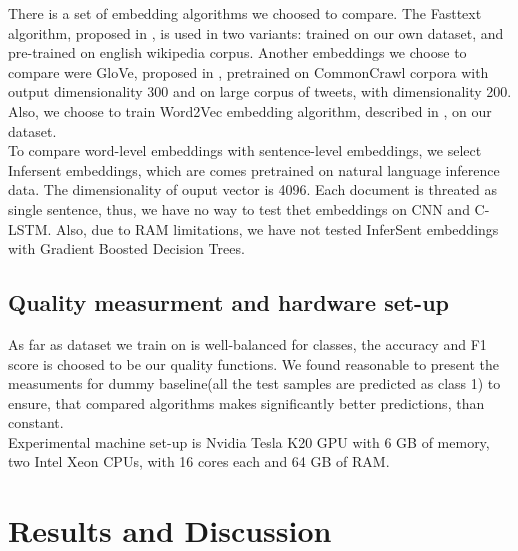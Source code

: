 \documentclass[unicode, 12pt, a4paper,oneside]{article}
\begin{document}
	There is a set of embedding algorithms we choosed to compare. The Fasttext algorithm, proposed in \cite{fasttext}, is used in two variants: trained on our own dataset, and pre-trained on english wikipedia corpus. Another embeddings we choose to compare were GloVe, proposed in \cite{glove}, pretrained on CommonCrawl corpora with output dimensionality 300 and on large corpus of tweets, with dimensionality 200. Also, we choose to train Word2Vec embedding algorithm, described in \cite{word2vec}, on our dataset.\\
	To compare word-level embeddings with sentence-level embeddings, we select Infersent\cite{infersent} embeddings, which are comes pretrained on natural language inference data. The dimensionality of ouput vector is 4096. Each document is threated as single sentence, thus, we have no way to test thet embeddings on CNN and C-LSTM. Also, due to RAM limitations, we have not tested InferSent embeddings with Gradient Boosted Decision Trees.

	\subsection{Quality measurment and hardware set-up}

	As far as dataset we train on is well-balanced for classes, the accuracy and F1 score is choosed to be our quality functions. We found reasonable to present the measuments for dummy baseline(all the test samples are predicted as class 1) to ensure, that compared algorithms makes significantly better predictions, than constant.\\
	Experimental machine set-up is Nvidia Tesla K20 GPU with 6 GB of memory, two Intel Xeon CPUs, with 16 cores each and 64 GB of RAM.

	\section{Results and Discussion}
\end{document}

